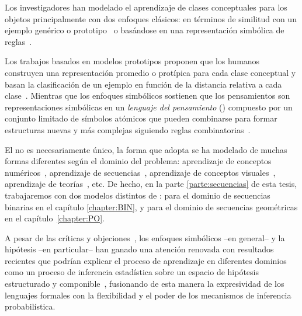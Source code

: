 Los investigadores han modelado el aprendizaje de clases conceptuales para los objetos principalmente con dos enfoques clásicos: en términos de similitud con un ejemplo genérico o prototipo~\cite{rosch1999principles, nosofsky1986attention, rosch1976structural, rosch1975family} o basándose en una representación simbólica de reglas~\cite{boole1854investigation, fodor1975language, gentner1983structure}.

Los trabajos basados en modelos prototipos proponen que los humanos construyen una representación promedio o protípica para cada clase conceptual y basan la clasificación de un ejemplo en función de la distancia relativa a cada clase~\cite{wilson2001encyclopedia}. Mientras que los enfoques simbólicos sostienen que los pensamientos son representaciones simbólicas en un \textit{lenguaje del pensamiento} (\lot) compuesto por un conjunto limitado de símbolos atómicos que pueden combinarse para formar estructuras nuevas y más complejas siguiendo reglas combinatorias~\cite{fodor1975language,nosofsky1994rule, tenenbaum2011grow, maddox1993comparing}. 

El \lot no es necesariamente único, la forma que adopta se ha modelado de muchas formas diferentes según el dominio del problema: aprendizaje de conceptos numéricos~\cite{piantadosi2012bootstrapping}, aprendizaje de secuencias~\cite{amalric2017language, yildirim2015learning, romano2013language}, aprendizaje de conceptos visuales~\cite{ellis2015unsupervised}, aprendizaje de teorías~\cite{ullman2012theory}, etc. De hecho, en la parte \ref{parte:secuencias} de esta tesis, trabajaremos con dos modelos distintos de \lot: para el dominio de secuencias binarias en el capítulo \ref{chapter:BIN}, y para el dominio de secuencias geométricas en el capítulo~\ref{chapter:PO}.

A pesar de las críticas y objeciones~\cite{blackburn1984spreading,loewer1991meaning,knowles1998language,aydede1997language,wilson2001encyclopedia}, los enfoques simbólicos --en general-- y la hipótesis \lot{ }--en particular-- han ganado una atención renovada con resultados recientes que podrían explicar el proceso de aprendizaje en diferentes dominios como un proceso de inferencia estadística sobre un espacio de hipótesis estructurado y componible~\cite{tenenbaum2011grow,piantadosi2016four}, fusionando de esta manera la expresividad de los lenguajes formales con la flexibilidad y el poder de los mecanismos de inferencia probabilística.

